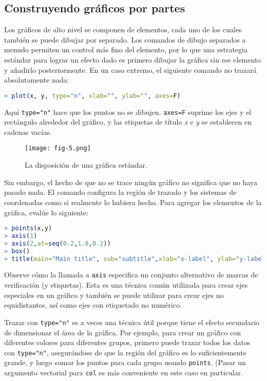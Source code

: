 \subsection{Construyendo gráficos por partes}

Los gráficos de alto nivel se componen de elementos, cada uno de los cuales
también se puede dibujar por separado. Los comandos de dibujo separados a menudo
permiten un control más fino del elemento, por lo que una estrategia estándar
para lograr un efecto dado es primero dibujar la gráfica sin ese elemento y
añadirlo posteriormente. En un caso extremo, el siguiente comando no trazará
absolutamente nada:

\begin{lstlisting}[language=R]
> plot(x, y, type="n", xlab="", ylab="", axes=F)
\end{lstlisting}

Aquí \texttt{type="n"} hace que los puntos no se dibujen. \texttt{axes=F}
suprime los ejes y el rectángulo alrededor del gráfico, y las etiquetas de
título \textit{x} e \textit{y} se establecen en cadenas vacías.

\begin{figure}[H]
  \texttt{[image: fig-5.png]}
  \caption{La disposición de una gráfica estándar.}
  \label{fig-5}
\end{figure}

Sin embargo, el hecho de que no se trace ningún gráfico no significa que no haya
pasado nada. El comando configura la región de trazado y los sistemas de
coordenadas como si realmente lo hubiera hecho. Para agregar los elementos de la
gráfica, evalúe lo siguiente:

\begin{lstlisting}[language=R]
> points(x,y)
> axis(1)
> axis(2,at=seq(0.2,1.8,0.2))
> box()
> title(main="Main title", sub="subtitle",xlab="x-label", ylab="y-label")
\end{lstlisting}

Observe cómo la llamada a \texttt{axis} especifica un conjunto alternativo de
marcas de verificación (y etiquetas). Esta es una técnica común utilizada para
crear ejes especiales en un gráfico y también se puede utilizar para crear ejes
no equidistantes, así como ejes con etiquetado no numérico.

Trazar con \texttt{type="n"} es a veces una técnica útil porque tiene el efecto
secundario de dimensionar el área de la gráfica. Por ejemplo, para crear un
gráfico con diferentes colores para diferentes grupos, primero puede trazar
todos los datos con \texttt{type="n"}, asegurándose de que la región del gráfico
es lo suficientemente grande, y luego sumar los puntos para cada grupo usando
\texttt{points}. (Pasar un argumento vectorial para \texttt{col} es más
conveniente en este caso en particular.

